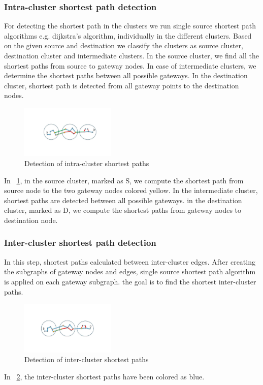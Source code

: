 \subsubsection{Intra-cluster shortest path detection} For detecting the shortest path in the clusters we run single source shortest path algorithms e.g. dijkstra's algorithm, individually in the different clusters. Based on the given source and destination we classify the clusters as source cluster, destination cluster and intermediate clusters. In the source cluster, we find all the shortest paths from source to gateway nodes. In case of intermediate clusters, we determine the shortest paths between all possible gateways. In the destination cluster, shortest path is detected from all gateway points to the destination nodes. \\
\begin{figure}[!htb]
\centering
\includegraphics[width=0.4\textwidth]{images/Intra_cluster_sssp.pdf}
\caption{Detection of intra-cluster shortest paths}
\label{fig:intra_clus_sp}
\end{figure}
In \figurename~\ref{fig:intra_clus_sp}, in the source cluster, marked as S, we compute the shortest path from source node to the two gateway nodes colored yellow. In the intermediate cluster, shortest paths are detected between all possible gateways. in the destination cluster, marked as D, we compute the shortest paths from gateway nodes to destination node.
\subsubsection{Inter-cluster shortest path detection} In this step, shortest paths calculated between inter-cluster edges. After creating the subgraphs of gateway nodes and edges, single source shortest path algorithm is applied on each gateway subgraph. the goal is to find the shortest inter-cluster paths.

\begin{figure}[!htb]
\centering
\includegraphics[width=0.4\textwidth]{images/Inter_cluster_sssp.pdf}
\caption{Detection of inter-cluster shortest paths}
\label{fig:inter_cluster_sp}
\end{figure}
In \figurename~\ref{fig:inter_cluster_sp}, the inter-cluster shortest paths have been colored as blue.
